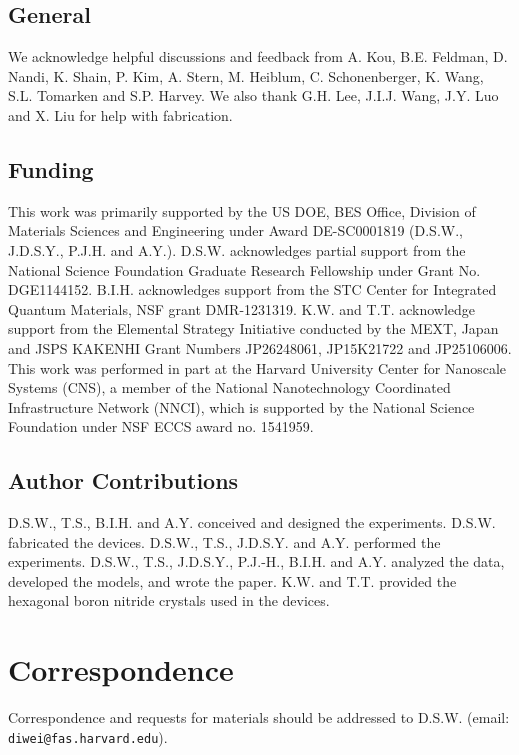 \documentclass[%
reprint,amsmath,amssymb,aps,prl,superscriptaddress,
twocolumn
]{revtex4-1}
\begin{document}
	\subsection{General}
	We acknowledge helpful discussions and feedback from  A. Kou, B.E. Feldman, D. Nandi, K. Shain, P. Kim, A. Stern, M. Heiblum, C. Schonenberger, K. Wang, S.L. Tomarken and S.P. Harvey. We also thank G.H. Lee, J.I.J. Wang, J.Y. Luo and X. Liu for help with fabrication.
	\subsection{Funding}This work was primarily supported by the US DOE, BES Office, Division of Materials Sciences and Engineering under Award DE-SC0001819 (D.S.W., J.D.S.Y., P.J.H. and A.Y.). D.S.W. acknowledges partial support from the National Science Foundation Graduate Research Fellowship under Grant No. DGE1144152. B.I.H. acknowledges support from the STC Center for Integrated Quantum Materials, NSF grant DMR-1231319. K.W. and T.T. acknowledge support from the Elemental Strategy Initiative conducted by the MEXT, Japan and JSPS KAKENHI Grant Numbers JP26248061, JP15K21722 and JP25106006. This work was performed in part at the Harvard University Center for Nanoscale Systems (CNS), a member of the National Nanotechnology Coordinated Infrastructure Network (NNCI), which is supported by the National Science Foundation under NSF ECCS award no. 1541959. 
	\subsection{Author Contributions} D.S.W., T.S., B.I.H. and A.Y. conceived and designed the experiments. D.S.W. fabricated the devices. D.S.W., T.S., J.D.S.Y. and A.Y. performed the experiments. D.S.W., T.S., J.D.S.Y., P.J.-H., B.I.H. and A.Y. analyzed the data, developed the models, and wrote the paper. K.W. and T.T. provided the hexagonal boron nitride crystals used in the devices. 
	\section{Correspondence} Correspondence and requests for materials should be addressed to D.S.W. (email: \mbox{\texttt{diwei@fas.harvard.edu}}).	
%	
%
	\newcommand{\beginsupplement}{%
		\setcounter{table}{0}
		\renewcommand{\thetable}{S\arabic{table}}%
		\setcounter{figure}{0}
		\renewcommand{\thefigure}{S\arabic{figure}}%
		\setcounter{equation}{0}
		\renewcommand{\theequation}{S\arabic{equation}}
	}
		\beginsupplement
		
\end{document}
